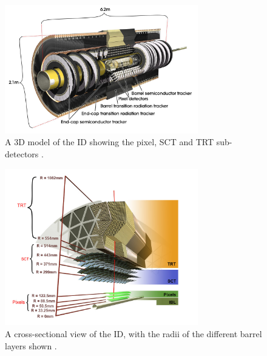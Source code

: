 \begin{figure}[!htpb]
  \centering
  \includegraphics[width=0.75\textwidth]{chapters/2.detector/figs/atlas_id.jpg}
  \caption{
    A 3D model of the \ATLAS ID showing the pixel, SCT and TRT sub-detectors \cite{atlasid}.
  }
  \label{fig:atlas_id_run1}
\end{figure}
%
\begin{figure}[!htpb]
  \centering
  \includegraphics[width=0.75\textwidth]{chapters/2.detector/figs/atlas_id_xs.png}
  \caption{A cross-sectional view of the \ATLAS ID, with the radii of the different barrel layers shown \cite{atlastrackingdocs}.}
  \label{fig:atlas_id_run2}
\end{figure}
%

